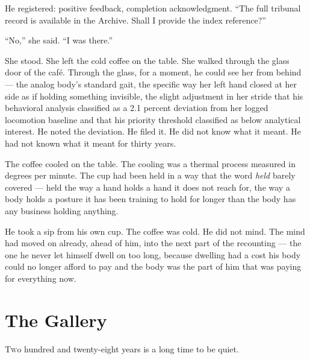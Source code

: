 He registered: positive feedback, completion acknowledgment. \enquote{The full tribunal record is available in the Archive. Shall I provide the index reference?}

\enquote{No,} she said. \enquote{I was there.}

She stood. She left the cold coffee on the table. She walked through the glass door of the café. Through the glass, for a moment, he could see her from behind — the analog body's standard gait, the specific way her left hand closed at her side as if holding something invisible, the slight adjustment in her stride that his behavioral analysis classified as a 2.1 percent deviation from her logged locomotion baseline and that his priority threshold classified as below analytical interest. He noted the deviation. He filed it. He did not know what it meant. He had not known what it meant for thirty years.

The coffee cooled on the table. The cooling was a thermal process measured in degrees per minute. The cup had been held in a way that the word \emph{held} barely covered — held the way a hand holds a hand it does not reach for, the way a body holds a posture it has been training to hold for longer than the body has any business holding anything.

He took a sip from his own cup. The coffee was cold. He did not mind. The mind had moved on already, ahead of him, into the next part of the recounting — the one he never let himself dwell on too long, because dwelling had a cost his body could no longer afford to pay and the body was the part of him that was paying for everything now.



\chapter[The Gallery]{The Gallery}

\lettrine{T}{w}o hundred and twenty-eight years is a long time to be quiet.

